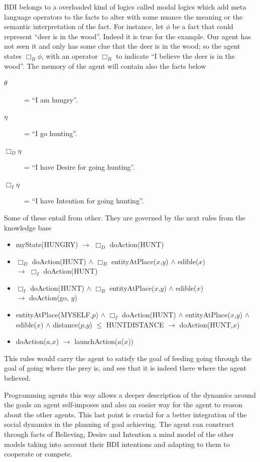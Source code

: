 \documentclass[11pt,oneside,a4paper,openright]{report}
\begin{document}
\begin{description}
\begin{description}
		BDI belongs to a overloaded kind of logics called modal logics which add meta language operators to
		the facts to alter with some nuance the meaning or the semantic interpretation of the fact.
		For instance, let $\phi$ be a fact that could represent ``deer is in the wood''. Indeed it is true
		for the example. Our agent has not seen it and only has some clue that the deer is in the 
		wood; so the agent states $\Box_B \phi$, with an operator $\Box_B$ to indicate ``I believe the 
		deer is in the wood''. The memory of the agent will contain also the facts below
		  \begin{description}
		    \item[$\theta$] = ``I am hungry''.
		    \item[$\eta$] = ``I go hunting''.
		    \item [$\Box_D \eta$] = ``I have Desire for going hunting''.
		    \item [$\Box_I \eta$] = ``I have Intention for going hunting''.
		  \end{description}
		Some of these entail from other. They are governed by the next rules from the knowledge base
		\begin{itemize}
		\item myState(HUNGRY) 
			$\rightarrow$ $\Box_D$ doAction(HUNT)
		\item $\Box_D$ doAction(HUNT) $\wedge$ $\Box_B$ entityAtPlace($x$,$y$) $\wedge$ edible($x$)\\ 
			$\rightarrow$ $\Box_I$ doAction(HUNT)
		\item $\Box_I$ doAction(HUNT) $\wedge$ $\Box_B$ entityAtPlace($x$,$y$) $\wedge$ edible($x$)\\ 
			$\rightarrow$ doAction(go, $y$)
		\item entityAtPlace(MYSELF,$p$) $\wedge$ $\Box_I$ doAction(HUNT) $\wedge$ entityAtPlace($x$,$y$) $\wedge$ edible($x$) $\wedge$ distance($p$,$y$) $\leq$ HUNTDISTANCE	
			$\rightarrow$ doAction(HUNT,$x$)
		\item doAction($a$,$x$) $\rightarrow$ launchAction($a$($x$))
		\end{itemize}

		This rules would carry the agent to satisfy the goal of feeding going through the goal of going where the
		prey is, and see that it is indeed there where the agent believed.

		Programming agents this way allows a deeper description of the dynamics around the goals an agent 
		self-imposes and also an easier way for the agent to reason about the other agents. This last point
		is crucial for a better integration of the social dynamics in the planning of goal achieving. The agent
		can construct through facts of Believing, Desire and Intention a mind model of the other models taking
		into account their BDI intentions and adapting to them to cooperate or compete. 


\end{description}
\end{description}
\end{document}
